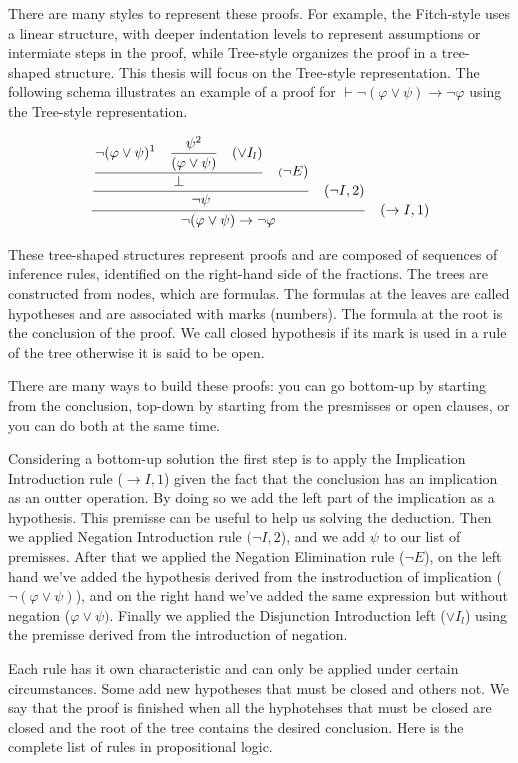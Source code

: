 There are many styles to represent these proofs. For example, the Fitch-style uses a linear structure, with deeper indentation levels to represent assumptions or intermiate steps in the proof, while Tree-style organizes the proof in a tree-shaped structure. This thesis will focus on the Tree-style representation. The following schema illustrates an example of a proof for \( \vdash \neg (\varphi \lor \psi) \to \neg \varphi \) using the Tree-style representation.

\[
\frac{\frac{\frac{
\displaystyle \neg (\varphi \lor \psi)^1 \quad \displaystyle \frac{\psi^2}{(\varphi \lor \psi) \strut} \quad (\lor I_l) \strut}
{\displaystyle \bot \strut} \quad (\displaystyle \neg E)\strut} {\displaystyle \neg \psi \strut} \quad (\neg I, 2) \strut}
{\neg (\varphi \lor \psi) \to \neg \varphi \strut} \quad (\to I, 1)
\]

These tree-shaped structures represent proofs and are composed of sequences of inference rules, identified on the right-hand side of the fractions. The trees are constructed from nodes, which are formulas. The formulas at the leaves are called hypotheses and are associated with marks (numbers). The formula at the root is the conclusion of the proof. We call closed hypothesis if its mark is used in a rule of the tree otherwise it is said to be open.

There are many ways to build these proofs: you can go bottom-up by starting from the conclusion, top-down by starting from the presmisses or open clauses, or you can do both at the same time. 

Considering a bottom-up solution the first step is to apply the Implication Introduction rule (\(\to I, 1\)) given the fact that the conclusion has an implication as an outter operation. By doing so we add the left part of the implication as a hypothesis. This premisse can be useful to help us solving the deduction. Then we applied Negation Introduction rule \((\neg I, 2\)), and we add \(\psi\) to our list of premisses. After that we applied the Negation Elimination rule (\(\neg E\)), on the left hand we've added the hypothesis derived from the instroduction of implication (\(\neg (\varphi \lor \psi)\)), and on the right hand we've added the same expression but without negation (\(\varphi \lor \psi)\). Finally we applied the Disjunction Introduction left (\(\lor I_l\)) using the premisse derived from the introduction of negation. 

Each rule has it own characteristic and can only be applied under certain circumstances. Some add new hypotheses that must be closed and others not. We say that the proof is finished when all the hyphotehses that must be closed are closed and the root of the tree contains the desired conclusion. Here is the complete list of rules in propositional logic.

